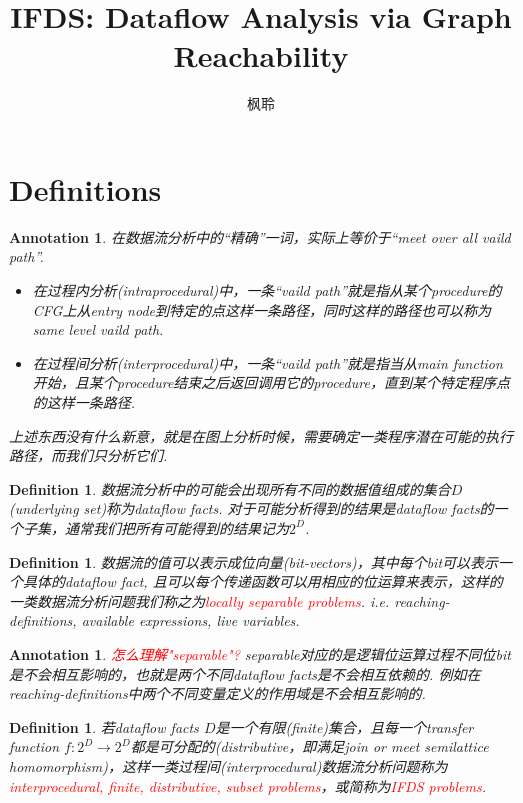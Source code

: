 \documentclass{article}
\newtheorem{definition}[theorem]{Definition}
\newtheorem{annotation}[theorem]{Annotation}
\newcommand*{\xfunc}[4]{{#2}\colon{#3}{#1}{#4}}
\newcommand*{\func}[3]{\xfunc{\to}{#1}{#2}{#3}}
\newcommand{\redt}[1]{\textcolor{red}{#1}}
\begin{document}
\title{IFDS: Dataflow Analysis via Graph Reachability}
\author{枫聆}
\maketitle
\tableofcontents

\newpage
\section{Definitions}


\begin{annotation}
\rm 在数据流分析中的“精确”一词，实际上等价于“meet over all vaild path”. 
\begin{itemize}
	\item 在过程内分析(intraprocedural)中，一条“vaild path”就是指从某个procedure的CFG上从entry node到特定的点这样一条路径，同时这样的路径也可以称为same level vaild path.  
	\item 在过程间分析(interprocedural)中，一条“vaild path”就是指当从main function开始，且某个procedure结束之后返回调用它的procedure，直到某个特定程序点的这样一条路径.  
\end{itemize}
上述东西没有什么新意，就是在图上分析时候，需要确定一类程序潜在可能的执行路径，而我们只分析它们.  
\end{annotation}

\begin{definition}
\rm 数据流分析中的可能会出现所有不同的数据值组成的集合$D$(underlying set)称为dataflow facts. 对于可能分析得到的结果是dataflow facts的一个子集，通常我们把所有可能得到的结果记为$2^D$. 
\end{definition}

\begin{definition}
\rm 数据流的值可以表示成位向量(bit-vectors)，其中每个bit可以表示一个具体的dataflow fact, 且可以每个传递函数可以用相应的位运算来表示，这样的一类数据流分析问题我们称之为\redt{locally separable problems}. i.e. reaching-definitions, available expressions, live variables. 
\end{definition}

\begin{annotation}
\rm \redt{怎么理解"separable"?} separable对应的是逻辑位运算过程不同位bit是不会相互影响的，也就是两个不同dataflow facts是不会相互依赖的. 例如在reaching-definitions中两个不同变量定义的作用域是不会相互影响的.   
\end{annotation}


\begin{definition}
\rm 若dataflow facts $D$是一个有限(finite)集合，且每一个transfer function $\func{f}{2^D}{2^D}$都是可分配的(distributive，即满足join or meet semilattice homomorphism)，这样一类过程间(interprocedural)数据流分析问题称为\redt{interprocedural, finite, distributive, subset problems}，或简称为\redt{IFDS problems}.
\end{definition}
\end{document}
